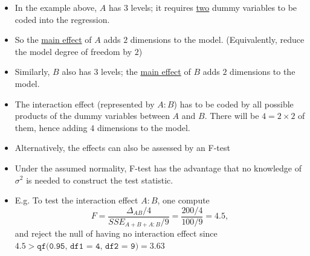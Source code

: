 \documentclass{beamer}
\newenvironment{wideitemize}%
  {\begin{itemize}%
    \setlength{\parskip}{1em}}%
  {\end{itemize}}
\begin{document}
\begin{frame}
\begin{wideitemize}
\item In the example above,  $A$ has $3$ levels;  it requires \underline{two} dummy variables to be coded into the regression. 

\item So the \underline{main effect} of $A$ adds $2$ dimensions to the model. (Equivalently, reduce the model degree of freedom by $2$)


\item Similarly, $B$ also has $3$ levels; the \underline{main effect} of $B$ adds $2$ dimensions to the model.


\item The interaction effect (represented by $A:B$) has to be coded by all possible products of the dummy variables between $A$ and $B$. There will be $4 = 2 \times 2$ of them, hence adding  $4$ dimensions to the model.



\end{wideitemize}

\end{frame}

\begin{frame}
\begin{wideitemize}

\item Alternatively, the effects can also be assessed by an F-test

\item Under the assumed normality, F-test has the advantage that no knowledge of $\sigma^2$ is needed to construct the test statistic. 

\item E.g. To test the interaction effect $A:B$, one compute 
\[
F = \frac{\Delta_{AB}/4}{SSE_{A + B + A:B}/9} = \frac{200/4}{100/9} =  4.5,
\]
and reject the null of having no interaction effect since $4.5 > \texttt{qf(0.95, df1 = 4, df2 = 9)} = 3.63$
\end{wideitemize}
\end{frame}
\end{document}
